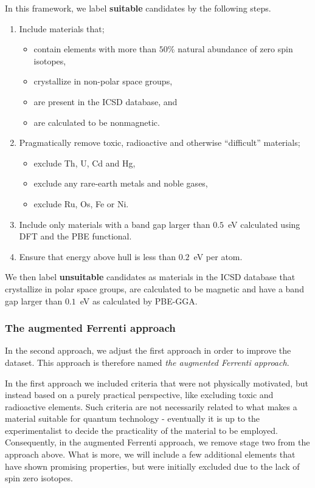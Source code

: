 \documentclass[superscriptaddress,unsortedaddress,
 amsmath,amssymb,
 aps,
]{revtex4-2}
\begin{document}
In this framework, we label \textbf{suitable} candidates by the following steps. 
\begin{enumerate}
    \item Include materials that;
    \begin{itemize}
        \item contain elements with more than $50\%$ natural abundance of 
            zero spin isotopes,
        \item crystallize in non-polar space groups,
        \item are present in the ICSD database, and
        \item are calculated to be nonmagnetic. 
    \end{itemize}
    \item Pragmatically remove toxic, radioactive and otherwise 
        ``difficult'' materials;
    \begin{itemize}
        \item exclude Th, U, Cd and Hg,
        \item exclude any rare-earth metals and noble gases,
        \item exclude Ru, Os, Fe or Ni.
    \end{itemize}
    \item Include only materials with a band gap larger than $0.5$~eV calculated using DFT and the PBE functional. 
    \item Ensure that energy above hull is less than $0.2$~eV per atom.
\end{enumerate}

We then label \textbf{unsuitable} candidates as materials in the ICSD database that crystallize in polar space groups, are calculated 
to be magnetic and have a band gap larger than $0.1$~eV as calculated by PBE-GGA.

\subsubsection*{The augmented Ferrenti approach}
In the second approach, we adjust the first approach in order to 
improve the dataset. This approach is therefore named
\emph{the augmented Ferrenti approach}.

In the first approach we included criteria that were not physically motivated, but instead based on a purely practical perspective, like excluding toxic and
radioactive elements. Such criteria are not necessarily related to what makes 
a material suitable for quantum technology - eventually it is up to the 
experimentalist to decide the practicality of the material to be employed. 
Consequently, in the augmented Ferrenti approach, we remove stage two from the approach above. What is more, we will include a few additional elements that have shown promising properties, but were initially excluded due to the lack of spin zero isotopes. 
\end{document}

